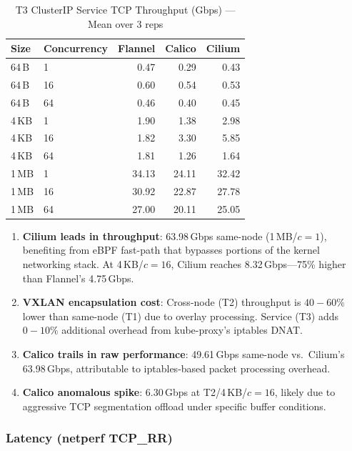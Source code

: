 \documentclass[11pt,a4paper]{article}
\begin{document}
\begin{table}[H]
\centering
\caption{T3 ClusterIP Service TCP Throughput (Gbps) --- Mean over 3 reps}
\begin{tabular}{llrrr}
  \toprule
  \textbf{Size} & \textbf{Concurrency} & \textbf{Flannel} & \textbf{Calico} & \textbf{Cilium} \\
  \midrule
  64\,B  & 1  & 0.47 & 0.29 & 0.43 \\
  64\,B  & 16 & 0.60 & 0.54 & 0.53 \\
  64\,B  & 64 & 0.46 & 0.40 & 0.45 \\
  4\,KB  & 1  & 1.90 & 1.38 & 2.98 \\
  4\,KB  & 16 & 1.82 & 3.30 & 5.85 \\
  4\,KB  & 64 & 1.81 & 1.26 & 1.64 \\
  1\,MB  & 1  & 34.13 & 24.11 & 32.42 \\
  1\,MB  & 16 & 30.92 & 22.87 & 27.78 \\
  1\,MB  & 64 & 27.00 & 20.11 & 25.05 \\
  \bottomrule
\end{tabular}
\label{tab:kc-t3}
\end{table}

\begin{findingbox}
\begin{enumerate}
  \item \textbf{Cilium leads in throughput}: 63.98\,Gbps same-node (1\,MB/$c{=}1$), benefiting from eBPF fast-path that bypasses portions of the kernel networking stack. At 4\,KB/$c{=}16$, Cilium reaches 8.32\,Gbps---75\% higher than Flannel's 4.75\,Gbps.
  \item \textbf{VXLAN encapsulation cost}: Cross-node (T2) throughput is $40{-}60\%$ lower than same-node (T1) due to overlay processing. Service (T3) adds $0{-}10\%$ additional overhead from kube-proxy's iptables DNAT.
  \item \textbf{Calico trails in raw performance}: 49.61\,Gbps same-node vs.\ Cilium's 63.98\,Gbps, attributable to iptables-based packet processing overhead.
  \item \textbf{Calico anomalous spike}: 6.30\,Gbps at T2/4\,KB/$c{=}16$, likely due to aggressive TCP segmentation offload under specific buffer conditions.
\end{enumerate}
\end{findingbox}

\subsubsection{Latency (netperf TCP\_RR)}
\end{document}
